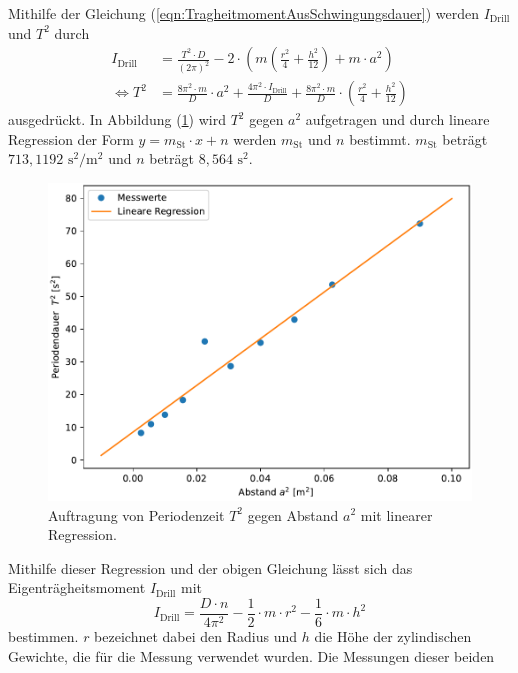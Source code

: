   Mithilfe der Gleichung (\ref{eqn:TragheitmomentAusSchwingungsdauer})
  werden $I_{\text{Drill}}$ und $T^2$ durch
  \begin{align}
    I_{\text{Drill}} &= \frac{T^{2} \cdot D}{\left(2 \pi\right)^{2}} - 2 \cdot \left(m \left(\frac{r^{2}}{4} + \frac{h^{2}}{12} \right) + m \cdot a^2 \right) \\
    \Leftrightarrow T^2 &= \frac{8 \pi^2 \cdot m}{D} \cdot a^2 + \frac{4 \pi^2 \cdot I_{\text{Drill}}}{D} + \frac{8\pi^2 \cdot m}{D} \cdot \left( \frac{r^2}{4} + \frac{h^2}{12} \right)
  \end{align}
  ausgedrückt.
  In Abbildung (\ref{fig:plot}) wird $T^2$ gegen $a^2$ aufgetragen und durch lineare Regression der Form $y = m_{\text{St}} \cdot x + n$ werden $m_{\text{St}}$ und $n$ bestimmt.
  $m_{\text{St}}$ beträgt $713,1192 \,\, \unit{\second\squared\per\meter\squared}$ und $n$ beträgt $8,564\,\, \unit{\second\squared}$. 
  \begin{figure}[H]
    \centering
    \includegraphics{plot.pdf}
    \caption{Auftragung von Periodenzeit $T^2$ gegen Abstand $a^2$ mit linearer Regression.}
    \label{fig:plot}
  \end{figure}
  Mithilfe dieser Regression und der obigen Gleichung lässt sich das Eigenträgheitsmoment $I_{\text{Drill}}$ mit
  \begin{equation}
    I_{\text{Drill}} = \frac{D \cdot n}{4 \pi^2} - \frac{1}{2} \cdot m \cdot r^2 - \frac{1}{6} \cdot m \cdot h^2
  \end{equation}
  bestimmen. $r$ bezeichnet dabei den Radius und $h$ die Höhe der zylindischen Gewichte, die für die Messung verwendet wurden. Die Messungen dieser beiden
